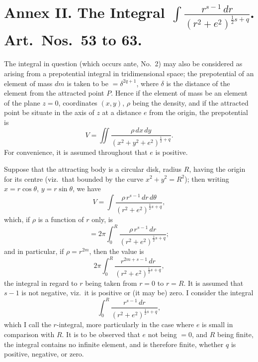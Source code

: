 \documentclass[11pt,a4paper]{book}
\begin{document}
\section*{Annex II. The Integral $\displaystyle\int \frac{r^{s-1}\,dr}{(r^2 + e^2)^{\frac{1}{2}s+q}}$. Art.\ Nos.\ 53 to 63.}

\begin{art}\label{art:53}
The integral in question (which occurs ante, No.\ 2) may also be considered as arising from a prepotential integral in tridimensional space; the prepotential of an element of mass $dm$ is taken to be $= \delta^{2q+1}$, where $\delta$ is the distance of the element from the attracted point $P$. Hence if the element of mass be an element of the plane $z = 0$, coordinates $(x, y)$, $\rho$ being the density, and if the attracted point be situate in the axis of $z$ at a distance $e$ from the origin, the prepotential is
\[
V = \iint \frac{\rho \, dx \, dy}{(x^2 + y^2 + e^2)^{\frac{1}{2}+q}}.
\]
For convenience, it is assumed throughout that $e$ is positive.

Suppose that the attracting body is a circular disk, radius $R$, having the origin for its centre (viz.\ that bounded by the curve $x^2 + y^2 = R^2$); then writing $x = r\cos\theta$, $y = r\sin\theta$, we have
\[
V = \int \frac{\rho \, r^{s-1} \, dr \, d\theta}{(r^2 + e^2)^{\frac{1}{2}s+q}},
\]
which, if $\rho$ is a function of $r$ only, is
\[
= 2\pi \int_0^R \frac{\rho \, r^{s-1} \, dr}{(r^2 + e^2)^{\frac{1}{2}s+q}};
\]
and in particular, if $\rho = r^{2m}$, then the value is
\[
2\pi \int_0^R \frac{r^{2m+s-1} \, dr}{(r^2 + e^2)^{\frac{1}{2}s+q}},
\]
the integral in regard to $r$ being taken from $r = 0$ to $r = R$. It is assumed that $s-1$ is not negative, viz.\ it is positive or (it may be) zero. I consider the integral
\[
\int_0^R \frac{r^{s-1} \, dr}{(r^2 + e^2)^{\frac{1}{2}s+q}},
\]
which I call the $r$-integral, more particularly in the case where $e$ is small in comparison with $R$. It is to be observed that $e$ not being $= 0$, and $R$ being finite, the integral contains no infinite element, and is therefore finite, whether $q$ is positive, negative, or zero.
\end{art}
\end{document}
